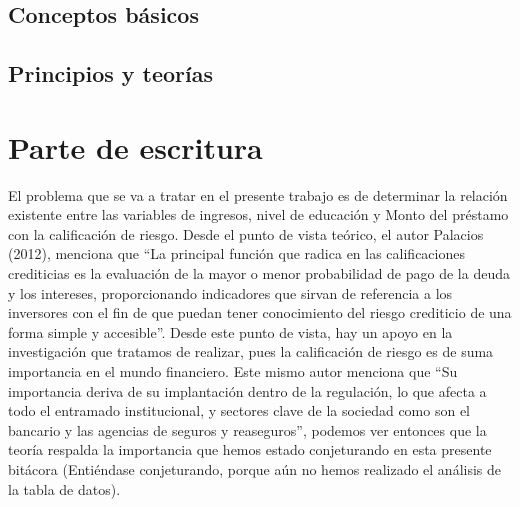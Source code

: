 \documentclass[
  letterpaper,
  DIV=11,
  numbers=noendperiod]{scrreprt}
\begin{document}
\subsection{Conceptos básicos}\label{conceptos-buxe1sicos}

\subsection{Principios y teorías}\label{principios-y-teoruxedas}

\section{Parte de escritura}\label{parte-de-escritura}

El problema que se va a tratar en el presente trabajo es de determinar
la relación existente entre las variables de ingresos, nivel de
educación y Monto del préstamo con la calificación de riesgo. Desde el
punto de vista teórico, el autor Palacios (2012), menciona que ``La
principal función que radica en las calificaciones crediticias es la
evaluación de la mayor o menor probabilidad de pago de la deuda y los
intereses, proporcionando indicadores que sirvan de referencia a los
inversores con el fin de que puedan tener conocimiento del riesgo
crediticio de una forma simple y accesible''. Desde este punto de vista,
hay un apoyo en la investigación que tratamos de realizar, pues la
calificación de riesgo es de suma importancia en el mundo financiero.
Este mismo autor menciona que ``Su importancia deriva de su implantación
dentro de la regulación, lo que afecta a todo el entramado
institucional, y sectores clave de la sociedad como son el bancario y
las agencias de seguros y reaseguros'', podemos ver entonces que la
teoría respalda la importancia que hemos estado conjeturando en esta
presente bitácora (Entiéndase conjeturando, porque aún no hemos
realizado el análisis de la tabla de datos).
\end{document}
